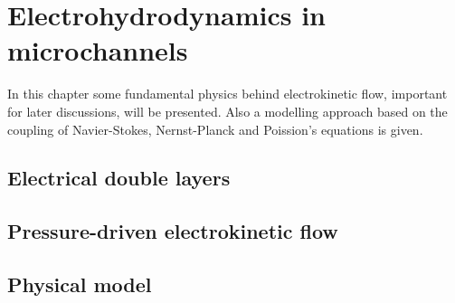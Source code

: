 \chapter{Electrohydrodynamics in microchannels}

In this chapter some fundamental physics behind electrokinetic flow,
important for later discussions, will be presented. Also a
modelling approach based on the coupling of Navier-Stokes,
Nernst-Planck and Poission's equations is given.

\section{Electrical double layers}

\section{Pressure-driven electrokinetic flow}

\section{Physical model}




